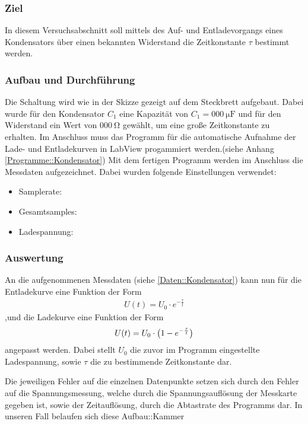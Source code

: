 \documentclass[12pt,twoside,a4paper]{scrartcl}
\begin{document}
			\subsubsection{Ziel}
				In diesem Versuchsabschnitt soll mittels des Auf- und Entladevorgangs eines Kondensators über einen bekannten Widerstand die Zeitkonstante $\tau$ bestimmt werden.

			\subsubsection{Aufbau und Durchführung}

				Die Schaltung wird wie in der Skizze gezeigt auf dem Steckbrett aufgebaut. Dabei wurde für den Kondensator $C_1$ eine Kapazität von $C_1 = \SI{000}{\micro \farad}$ und für den Widerstand ein Wert von $\SI{000}{\ohm}$ gewählt, um eine große Zeitkonstante zu erhalten. Im Anschluss muss das Programm für die automatische Aufnahme der Lade- und Entladekurven in LabView progammiert werden.(siehe Anhang \ref{Programme::Kondensator}) Mit dem fertigen Programm werden im Anschluss die Messdaten aufgezeichnet. Dabei wurden folgende Einstellungen verwendet:

				\begin{itemize}
					\item Samplerate:
					\item Gesamtsamples:
					\item Ladespannung:
				\end{itemize}

			\subsubsection{Auswertung}

				An die aufgenommenen Messdaten (siehe \ref{Daten::Kondensator}) kann nun für die Entladekurve eine Funktion der Form
				\begin{align*}
					U(t) = U_0 \cdot e^{-\frac{\tau}{t}}
				\end{align*}
				,und die Ladekurve eine Funktion der Form
				\begin{align*}
					U(t) = U_0 \cdot \qty(1-e^{-\frac{\tau}{t}})
				\end{align*}
				angepasst werden. Dabei stellt $U_0$ die zuvor im Programm eingestellte Ladespannung, sowie $\tau$ die zu bestimmende Zeitkonstante dar.

				Die jeweiligen Fehler auf die einzelnen Datenpunkte setzen sich durch den Fehler auf die Spannungsmessung, welche durch die Spannungsauflösung der Messkarte gegeben ist, sowie der Zeitauflösung, durch die Abtastrate des Programms dar. In unseren Fall belaufen sich diese Aufbau::Kammer
\end{document}

